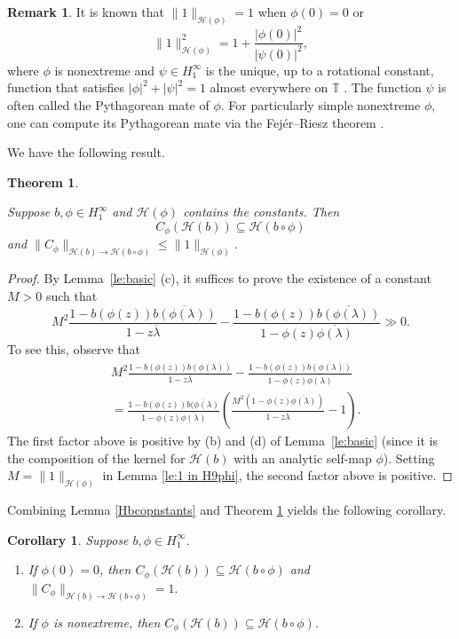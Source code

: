\documentclass[11pt]{amsart}
\def\T{\mathbb{T}}
\def\HH{{\mathcal H}}
\renewcommand{\leq}{\leqslant}
\renewcommand{\subset}{\subseteq}
\numberwithin{equation}{section}
\theoremstyle{plain}
\newtheorem{corollary}[equation]{Corollary}
\newtheorem{theorem}[equation]{Theorem}
\theoremstyle{definition}
\newtheorem{remark}[equation]{Remark}
\begin{document}
\begin{remark}\label{mate}
It is known  that $\|1\|_{\HH(\phi)} = 1$ when $\phi(0) = 0$ or 
$$\|1\|_{\HH(\phi)}^2 = 1 + \frac{|\phi(0)|^2}{|\psi(0)|^2},$$
where $\phi$ is nonextreme and 
$\psi \in H^{\infty}_{1}$ is the unique, up to a rotational constant, function that satisfies $|\phi|^2 + |\psi|^2 = 1$ almost everywhere on $\T$ \cite[Thm.~23.24]{Hb2-book}. The function $\psi$ is often called the Pythagorean mate of $\phi$. For particularly simple nonextreme $\phi$, one can compute its Pythagorean mate via the Fej\'{e}r--Riesz theorem \cite[Sec.~6]{MR3503356}. 
\end{remark}

We have the following result.

\begin{theorem}\label{th:main}
	
	Suppose $b, \phi\in H^\infty_1$ and $ \HH(\phi) $ contains the constants. Then 	
	$$C_\phi(\HH(b))\subset \HH(b\circ \phi)$$ and $\|C_{\phi}\|_{\HH(b) \to \HH(b \circ \phi)} \leq  \| 1 \|_{\HH(\phi)} $.
	
\end{theorem}
\begin{proof}
	By Lemma~\ref{le:basic} (c), it suffices to prove the existence of a constant $M > 0$ such that 
	\[
M^2	\frac{1-b(\phi(z))\overline{b(\phi(\lambda ))}}{1-z \overline{\lambda}}-\frac{1-b(\phi(z))\overline{b(\phi(\lambda))}}{1-\phi(z)\overline{\phi(\lambda)}}\gg0.
	\]
	To see this, observe that 
	\[
	\begin{split}
		&M^2	\frac{1-b(\phi(z))\overline{b(\phi(\lambda))}}{1-z \overline{\lambda}}-\frac{1-b(\phi(z))\overline{b(\phi(\lambda))}}{1-\phi(z)\overline{\phi(\lambda)}}\\
		&=\frac{1-b(\phi(z))\overline{b(\phi(\lambda)}}{1-\phi(z)\overline{\phi(\lambda)}}\left( \frac{M^2(1-\phi(z)\overline{\phi(\lambda)})}{1-z \overline{\lambda}}-1\right).
	\end{split}
	\]
		The first factor above is positive by (b) and (d) of 
 Lemma~\ref{le:basic} (since it is the composition of the kernel for $ \HH(b) $ with an analytic self-map $ \phi $). Setting $M = \|1\|_{\HH(\phi)}$ in Lemma \ref{le:1 in H9phi}, the second factor above is positive.
\end{proof}

Combining Lemma \ref{Hbcopnstants} and Theorem \ref{th:main} yields the following corollary.

\begin{corollary}\label{co:who contains the constants}
Suppose $b, \phi\in H^\infty_1$.

\begin{enumerate}
	\item If $ \phi(0)=0 $, then 	$C_\phi(\HH(b))\subset \HH(b\circ \phi)$ and $\|C_{\phi}\|_{\HH(b) \to \HH(b \circ \phi)} = 1.$
	
	\item If $\phi$ is nonextreme, then 	$C_\phi(\HH(b))\subset \HH(b\circ \phi)$.
	
\end{enumerate}
\end{corollary}
\end{document}
